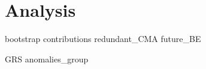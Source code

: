 
\section*{Analysis}

{bootstrap}
{contributions}
{redundant_CMA}
{future_BE}

{GRS}
{anomalies_group}

